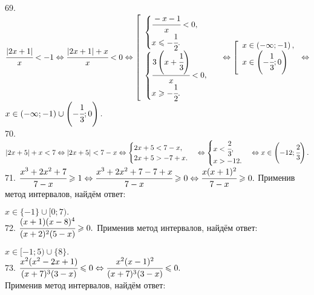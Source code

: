 69. $\cfrac{|2x+1|}{x}<-1\Leftrightarrow\cfrac{|2x+1|+x}{x}<0\Leftrightarrow
\left[\begin{array}{l}\begin{cases}\cfrac{-x-1}{x}<0,\\ x\leqslant-\cfrac{1}{2}.\end{cases}\\ \begin{cases}\cfrac{3\left(x+\cfrac{1}{3}\right)}{x}<0,\\ x\geqslant-\cfrac{1}{2}.\end{cases}  \end{array}\right.\Leftrightarrow\left[\begin{array}{l} x\in\left(-\infty;-1\right),\\
x\in\left(-\cfrac{1}{3};0\right)\end{array}\right.\Leftrightarrow$\\$ x\in\left(-\infty;-1\right)\cup\left(-\cfrac{1}{3};0\right).$\\
70. $|2x+5|+x<7\Leftrightarrow |2x+5|<7-x\Leftrightarrow \begin{cases}2x+5<7-x,\\ 2x+5>-7+x.\end{cases}
\Leftrightarrow \begin{cases}x<\cfrac{2}{3},\\ x>-12.\end{cases}\Leftrightarrow x\in\left(-12;\cfrac{2}{3}\right).$\\
71. $\cfrac{x^3+2x^2+7}{7-x}\geqslant1\Leftrightarrow\cfrac{x^3+2x^2+7-7+x}{7-x}\geqslant0\Leftrightarrow
\cfrac{x(x+1)^2}{7-x}\geqslant0.$ Применив метод интервалов, найдём ответ:
\begin{figure}[ht!]
\end{figure}
$x\in\{-1\}\cup[0;7).$\\
72. $\cfrac{(x+1)(x-8)^4}{(x+2)^2(5-x)}\geqslant0.$ Применив метод интервалов, найдём ответ:
\begin{figure}[ht!]
\end{figure}
$x\in[-1;5)\cup\{8\}.$\\
73. $\cfrac{x^2(x^2-2x+1)}{(x+7)^3(3-x)}\leqslant0\Leftrightarrow\cfrac{x^2(x-1)^2}{(x+7)^3(3-x)}\leqslant0.$\\ Применив метод интервалов, найдём ответ:
\begin{figure}[ht!]
\end{figure}

